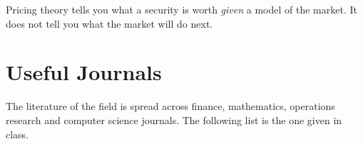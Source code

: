 \suppstart
\begin{moral}
	Pricing theory tells you what a security is worth \emph{given} a model of the market.
	It does not tell you what the market will do next.
\end{moral}
\suppend

\section{Useful Journals}


The literature of the field is spread across finance, mathematics, operations research and computer science journals.
The following list is the one given in class.

